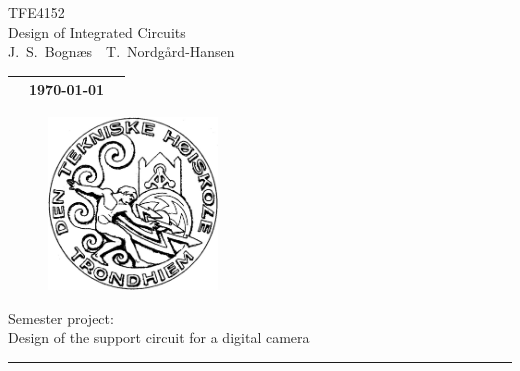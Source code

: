 \documentclass[a4paper, 12pt, english]{article}
\begin{document}
\begin{minipage}[c]{0.75\textwidth}
  \huge \centering
  TFE4152\\Design of Integrated Circuits\\
  
  \vspace{1cm}
  \Large
  J.~S.~Bognæs~~T.~Nordgård-Hansen
  \vspace{2cm}
  
  \normalsize
  
  \begin{tabular}{p{} p{} p{}}
    \toprule
    &\today\\
    \bottomrule
  \end{tabular}
\end{minipage}

\vspace{2cm}

\begin{figure}[H]
  \centering
  \includegraphics[width=0.4\textwidth]{figures/logo.png}
\end{figure}

\centering
\vspace{1.5cm}
  \LARGE {
    Semester project:\\
    Design of the support circuit for a digital camera
  }\\
\raggedright


\newpage
\setlength{\parskip}{0ex}
\renewcommand{\baselinestretch}{0.1}\normalsize
\onehalfspacing
\tableofcontents
\singlespacing
\renewcommand{\baselinestretch}{1.00}\normalsize
\setlength{\parskip}{2ex}
\rule{\textwidth}{1pt}


% 
\end{document}
